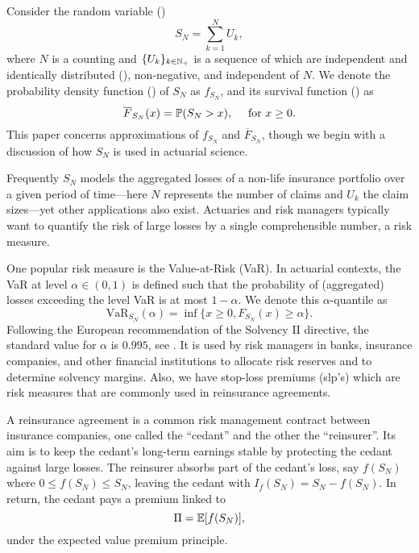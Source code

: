 Consider the random variable (\rv)
\begin{equation*}\label{eq:AggregatedClaimAmountsRV}
S_N=\sum_{k=1}^{N}U_{k},
\end{equation*}
where $N$ is a counting \rv and $\{U_{k}\}_{k\in\Npos}$ is a sequence of \rvs which are independent and identically distributed (\iid), non-negative, and independent of $N$.
We denote the probability density function (\pdf) of $S_N$ as $f_{S_N}$, and its survival function (\svf) as
\begin{equation*}\label{eq:DefinitionSurvivalFunction}
\overline{F}_{S_N}(x)= \P(S_N>x),\quad \text{ for } x\geq0.
\end{equation*}
This paper concerns approximations of $f_{S_N}$ and $\overline{F}_{S_N}$, though we begin with a discussion of how $S_N$ is used in actuarial science.

Frequently $S_N$ models the aggregated losses of a non-life insurance portfolio over a given period of time---here $N$ represents the number of claims and $U_k$ the claim sizes---yet other applications also exist. Actuaries and risk managers typically want to quantify the risk of large losses by a single comprehensible number, a risk measure.

One popular risk measure is the Value-at-Risk (VaR). In actuarial contexts, the VaR at level $\alpha \in (0,1)$ is defined such that the probability of (aggregated) losses exceeding the level VaR is at most $1-\alpha$. We denote this $\alpha$-quantile as
\begin{equation*}
\text{VaR}_{S_N}(\alpha)=\inf\{x\geq0, F_{S_N}(x)\geq \alpha\}.
\end{equation*}
Following the European recommendation of the Solvency II directive, the standard value for $\alpha$ is $0.995$, see \cite{EIOPA}. It is used by risk managers in banks, insurance companies, and other financial institutions to allocate risk reserves and to determine solvency margins. Also, we have stop-loss premiums (slp's) which are risk measures that are commonly used in reinsurance agreements.

A reinsurance agreement is a common risk management contract between insurance companies, one called the ``cedant'' and the other the ``reinsurer''. Its aim is to keep the cedant's long-term earnings stable by protecting the cedant against large losses. The reinsurer absorbs part of the cedant's loss, say $f(S_N)$ where $0\leq f(S_N)\leq S_N$, leaving the cedant with $I_{f}(S_N)=S_N-f(S_N)$. In return, the cedant pays a premium linked to
\begin{equation*}\label{eq:DefinitionReinsurancePremium}
\Pi=\E[f(S_N)],
\end{equation*}
under the expected value premium principle.


